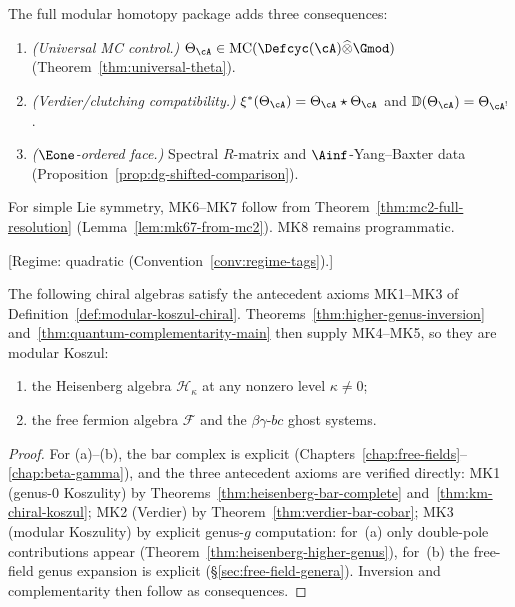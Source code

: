\begin{remark}
\label{rem:extended-axiom-schema}
The full modular homotopy package adds three consequences:
\begin{enumerate}[label=\textup{(MK\arabic*)},start=6]
\item\label{MK:mc-control}
\emph{(Universal MC control.)}
$\Theta_{\cA}\in\operatorname{MC}(\Defcyc(\cA)\widehat{\otimes}\Gmod)$
(Theorem~\ref{thm:universal-theta}).
\item\label{MK:clutching-verdier}
\emph{(Verdier/clutching compatibility.)}
$\xi^*(\Theta_{\cA})=\Theta_{\cA}\star\Theta_{\cA}$ and
$\mathbb{D}(\Theta_{\cA})=\Theta_{\cA^!}$.
\item\label{MK:e1-face}
\emph{($\Eone$-ordered face.)} Spectral $R$-matrix and
$\Ainf$-Yang--Baxter data
(Proposition~\ref{prop:dg-shifted-comparison}).
\end{enumerate}
For simple Lie symmetry, MK6--MK7 follow from
Theorem~\ref{thm:mc2-full-resolution}
(Lemma~\ref{lem:mk67-from-mc2}).  MK8 remains programmatic.
\end{remark}

\begin{proposition}
\label{prop:standard-examples-modular-koszul}
\textup{[Regime: quadratic
\textup{(}Convention~\textup{\ref{conv:regime-tags})}.]}

The following chiral algebras satisfy the antecedent axioms
\textup{MK1--MK3} of Definition~\textup{\ref{def:modular-koszul-chiral}}.
Theorems~\textup{\ref{thm:higher-genus-inversion}}
and~\textup{\ref{thm:quantum-complementarity-main}} then supply
\textup{MK4--MK5}, so they are modular Koszul:
\begin{enumerate}[label=\textup{(\alph*)}]
\item the Heisenberg algebra $\mathcal{H}_\kappa$ at any nonzero level
  $\kappa \neq 0$\textup{;}
\item the free fermion algebra $\mathcal{F}$ and the $\beta\gamma$-$bc$
  ghost systems.
\end{enumerate}
\end{proposition}

\begin{proof}
For (a)--(b), the bar complex is explicit
(Chapters~\ref{chap:free-fields}--\ref{chap:beta-gamma}), and the
three antecedent axioms are verified directly:
MK1 (genus-0 Koszulity) by
Theorems~\ref{thm:heisenberg-bar-complete} and~\ref{thm:km-chiral-koszul};
MK2 (Verdier) by Theorem~\ref{thm:verdier-bar-cobar};
MK3 (modular Koszulity) by explicit genus-$g$ computation: for~(a)
only double-pole contributions appear (Theorem~\ref{thm:heisenberg-higher-genus}),
for~(b) the free-field genus expansion is explicit
(\S\ref{sec:free-field-genera}).
Inversion and complementarity then follow as consequences.
\end{proof}


